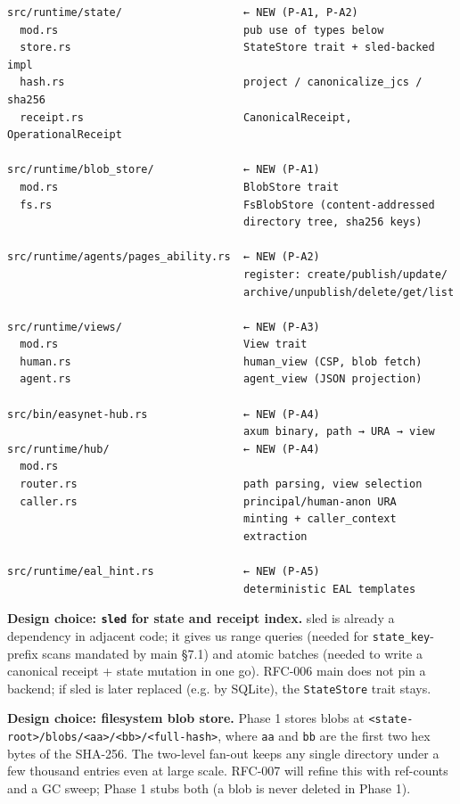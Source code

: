 \documentclass[11pt,a4paper]{article}
\theoremstyle{definition}
\begin{document}
\begin{lstlisting}
src/runtime/state/                   ← NEW (P-A1, P-A2)
  mod.rs                             pub use of types below
  store.rs                           StateStore trait + sled-backed impl
  hash.rs                            project / canonicalize_jcs / sha256
  receipt.rs                         CanonicalReceipt, OperationalReceipt

src/runtime/blob_store/              ← NEW (P-A1)
  mod.rs                             BlobStore trait
  fs.rs                              FsBlobStore (content-addressed
                                     directory tree, sha256 keys)

src/runtime/agents/pages_ability.rs  ← NEW (P-A2)
                                     register: create/publish/update/
                                     archive/unpublish/delete/get/list

src/runtime/views/                   ← NEW (P-A3)
  mod.rs                             View trait
  human.rs                           human_view (CSP, blob fetch)
  agent.rs                           agent_view (JSON projection)

src/bin/easynet-hub.rs               ← NEW (P-A4)
                                     axum binary, path → URA → view
src/runtime/hub/                     ← NEW (P-A4)
  mod.rs
  router.rs                          path parsing, view selection
  caller.rs                          principal/human-anon URA
                                     minting + caller_context
                                     extraction

src/runtime/eal_hint.rs              ← NEW (P-A5)
                                     deterministic EAL templates
\end{lstlisting}

\textbf{Design choice: \texttt{sled} for state and receipt index.}
sled is already a dependency in adjacent code; it gives us
range queries (needed for \texttt{state\_key}-prefix scans
mandated by main \S7.1) and atomic batches (needed to write a
canonical receipt + state mutation in one go). RFC-006 main does
not pin a backend; if sled is later replaced (e.g. by SQLite),
the \texttt{StateStore} trait stays.

\textbf{Design choice: filesystem blob store.} Phase 1 stores
blobs at \texttt{<state-root>/blobs/<aa>/<bb>/<full-hash>}, where
\texttt{aa} and \texttt{bb} are the first two hex bytes of the
SHA-256. The two-level fan-out keeps any single directory
under a few thousand entries even at large scale. RFC-007 will
refine this with ref-counts and a GC sweep; Phase 1 stubs both
(a blob is never deleted in Phase 1).
\end{document}

